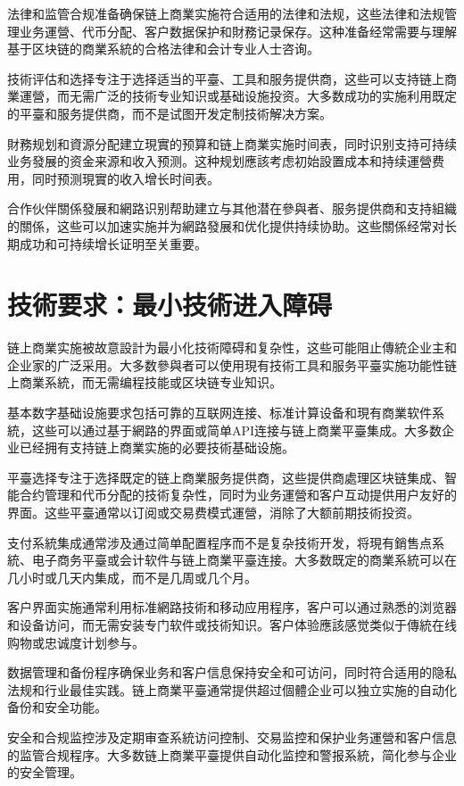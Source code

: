 \documentclass[
  Letterpaper,
]{scrbook}
\begin{document}
法律和监管合规准备确保链上商業实施符合适用的法律和法规，这些法律和法规管理业务運營、代币分配、客户数据保护和財務记录保存。这种准备经常需要与理解基于区块链的商業系統的合格法律和会计专业人士咨询。

技術评估和选择专注于选择适当的平臺、工具和服务提供商，这些可以支持链上商業運營，而无需广泛的技術专业知识或基础设施投资。大多数成功的实施利用既定的平臺和服务提供商，而不是试图开发定制技術解决方案。

財務规划和資源分配建立現實的预算和链上商業实施时间表，同时识别支持可持续业务發展的资金来源和收入预测。这种规划應該考虑初始設置成本和持续運營费用，同时预测現實的收入增长时间表。

合作伙伴關係發展和網路识别帮助建立与其他潜在參與者、服务提供商和支持組織的關係，这些可以加速实施并为網路發展和优化提供持续协助。这些關係经常对长期成功和可持续增长证明至关重要。

\section{技術要求：最小技術进入障碍}\label{ux6280ux8853ux8981ux6c42ux6700ux5c0fux6280ux8853ux8fdbux5165ux969cux788d}

链上商業实施被故意設計为最小化技術障碍和复杂性，这些可能阻止傳統企业主和企业家的广泛采用。大多数參與者可以使用現有技術工具和服务平臺实施功能性链上商業系統，而无需编程技能或区块链专业知识。

基本数字基础设施要求包括可靠的互联网连接、标准计算设备和現有商業软件系統，这些可以通过基于網路的界面或简单API连接与链上商業平臺集成。大多数企业已经拥有支持链上商業实施的必要技術基础设施。

平臺选择专注于选择既定的链上商業服务提供商，这些提供商處理区块链集成、智能合约管理和代币分配的技術复杂性，同时为业务運營和客户互动提供用户友好的界面。这些平臺通常以订阅或交易费模式運營，消除了大额前期技術投资。

支付系統集成通常涉及通过简单配置程序而不是复杂技術开发，将現有銷售点系統、电子商务平臺或会计软件与链上商業平臺连接。大多数既定的商業系統可以在几小时或几天内集成，而不是几周或几个月。

客户界面实施通常利用标准網路技術和移动应用程序，客户可以通过熟悉的浏览器和设备访问，而无需安装专门软件或技術知识。客户体验應該感觉类似于傳統在线购物或忠诚度计划参与。

数据管理和备份程序确保业务和客户信息保持安全和可访问，同时符合适用的隐私法规和行业最佳实践。链上商業平臺通常提供超过個體企业可以独立实施的自动化备份和安全功能。

安全和合规监控涉及定期审查系統访问控制、交易监控和保护业务運營和客户信息的监管合规程序。大多数链上商業平臺提供自动化监控和警报系統，简化参与企业的安全管理。
\end{document}
